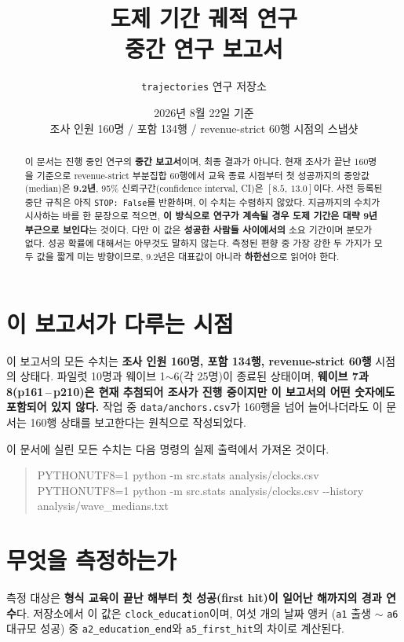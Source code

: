 \documentclass[11pt]{article}
\title{\bfseries 도제 기간 궤적 연구\\[0.3em]\large 중간 연구 보고서}
\author{\normalsize \texttt{trajectories} 연구 저장소}
\date{\normalsize 2026년 8월 22일 기준 \\[0.2em]
      \small 조사 인원 160명 / 포함 134행 / revenue-strict 60행 시점의 스냅샷}
\begin{document}
\maketitle

\begin{abstract}
\noindent
이 문서는 진행 중인 연구의 \textbf{중간 보고서}이며, 최종 결과가 아니다.
현재 조사가 끝난 160명을 기준으로 revenue-strict 부분집합 60행에서
교육 종료 시점부터 첫 성공까지의 중앙값(median)은 \textbf{9.2년},
95\% 신뢰구간(confidence interval, CI)은 $[8.5,\ 13.0]$이다.
사전 등록된 중단 규칙은 아직 \texttt{STOP: False}를 반환하며, 이 수치는 수렴하지 않았다.
지금까지의 수치가 시사하는 바를 한 문장으로 적으면,
\textbf{이 방식으로 연구가 계속될 경우 도제 기간은 대략 9년 부근으로 보인다}는 것이다.
다만 이 값은 \textbf{성공한 사람들 사이에서의} 소요 기간이며 분모가 없다.
성공 확률에 대해서는 아무것도 말하지 않는다.
측정된 편향 중 가장 강한 두 가지가 모두 값을 짧게 미는 방향이므로,
9.2년은 대표값이 아니라 \textbf{하한선}으로 읽어야 한다.
\end{abstract}

\section{이 보고서가 다루는 시점}

이 보고서의 모든 수치는 \textbf{조사 인원 160명, 포함 134행, revenue-strict 60행}
시점의 상태다. 파일럿 10명과 웨이브 1$\sim$6(각 25명)이 종료된 상태이며,
\textbf{웨이브 7과 8(p161\,--\,p210)은 현재 추첨되어 조사가 진행 중이지만
이 보고서의 어떤 숫자에도 포함되어 있지 않다.}
작업 중 \texttt{data/anchors.csv}가 160행을 넘어 늘어나더라도
이 문서는 160행 상태를 보고한다는 원칙으로 작성되었다.

이 문서에 실린 모든 수치는 다음 명령의 실제 출력에서 가져온 것이다.

\begin{quote}\ttfamily\small
PYTHONUTF8=1 python -m src.stats analysis/clocks.csv\\
PYTHONUTF8=1 python -m src.stats analysis/clocks.csv -{}-history analysis/wave\_medians.txt
\end{quote}

\section{무엇을 측정하는가}

측정 대상은 \textbf{형식 교육이 끝난 해부터 첫 성공(first hit)이 일어난 해까지의 경과 연수}다.
저장소에서 이 값은 \texttt{clock\_education}이며, 여섯 개의 날짜 앵커
(\texttt{a1} 출생 $\sim$ \texttt{a6} 대규모 성공) 중
\texttt{a2\_education\_end}와 \texttt{a5\_first\_hit}의 차이로 계산된다.
\end{document}
